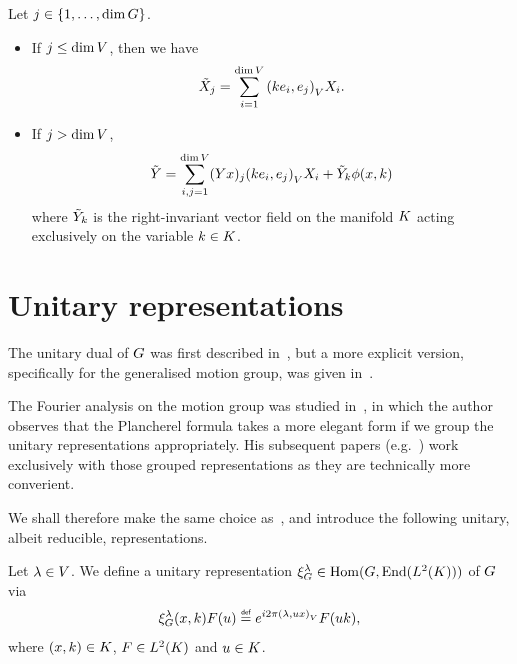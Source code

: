 \begin{corollary}
    Let $j \in \{1, \dots, \dim G\}$.
    \begin{itemize}
        \item
            If $j \leq \dim V$, then we have
            \begin{align*}
                \tilde{X}_j
                = \sum_{i = 1}^{\dim V} {\left(k e_i, e_j\right)_{V}} {X}_i.
            \end{align*}
        \item
            If $j > \dim V$,
            \begin{align*}
                \tilde{Y}
                = \sum_{i, j = 1}^{\dim V} (Y x)_j {\left(k e_i, e_j\right)_{V}} {X}_i
                + \tilde{Y}_k \phi(x, k)
            \end{align*}
            where $\tilde{Y}_k$ is the right-invariant vector field on the manifold $K$ acting exclusively on the variable $k \in K$.
    \end{itemize}
\end{corollary}

\section{Unitary representations}

The unitary dual of $G$ was first described in~\cite{Mackey51,Mackey52},
but a more explicit version,
specifically for the generalised motion group,
was given in~\cite{Ito52}.

The Fourier analysis on the motion group was studied in~\cite{Kumahara73},
in which the author observes that the Plancherel formula takes a more elegant form if we group the unitary representations appropriately.
His subsequent papers (e.g.\ \cite{Kumahara76}) work exclusively with those grouped representations as they are technically more converient.

We shall therefore make the same choice as~\cite{Kumahara76},
and introduce the following unitary, albeit reducible, representations.

\begin{definition}
\label{definition:reducible_representation}
    Let $\lambda \in V$.
    We define a unitary representation $\xi^{\lambda}_{G} \in \operatorname{Hom}(G, \operatorname{End}({L^{2} (K)}))$ of $G$ via
    \begin{align}
        \Rep{\lambda} (x, k) F(u) \defeq \e^{\i \turn \ip \lambda {u x}} F(u k),
        \label{eq:reducible_representations_on_the_motion_groups}
    \end{align}
    where $(x, k) \in K$, $F \in {L^{2} (K)}$ and $u \in K$.
\end{definition}

